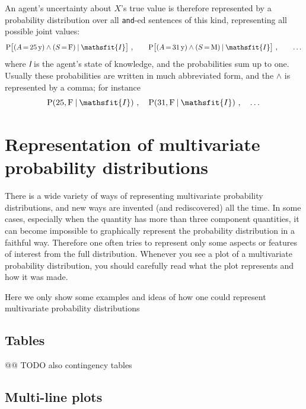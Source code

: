 \documentclass[
  a4paper,
  DIV=11,
  numbers=noendperiod,
  oneside]{scrreprt}
\begin{document}
An agent's uncertainty about \(X\)'s true value is therefore represented
by a probability distribution over all \texttt{and}-ed sentences of this
kind, representing all possible joint values: \[
\mathrm{P}\bigl[(A \mathord{\,=\,}25\,\mathrm{y}) \land (S\mathord{\,=\,}\mathrm{F}) \nonscript\:\vert\nonscript\:\mathopen{} \mathsfit{I}\bigr] \ , \qquad
\mathrm{P}\bigl[(A \mathord{\,=\,}31\,\mathrm{y}) \land (S\mathord{\,=\,}\mathrm{M}) \nonscript\:\vert\nonscript\:\mathopen{} \mathsfit{I}\bigr] \ , \qquad
\dotsc
\] where \(\mathsfit{I}\) is the agent's state of knowledge, and the
probabilities sum up to one. Usually these probabilities are written in
much abbreviated form, and the \(\land\) is represented by a comma; for
instance \[
\mathrm{P}(25, \mathrm{F} \nonscript\:\vert\nonscript\:\mathopen{} \mathsfit{I}) \ , \quad
\mathrm{P}(31, \mathrm{F} \nonscript\:\vert\nonscript\:\mathopen{} \mathsfit{I}) \ , \quad
\dotsc
\]

\hypertarget{representation-of-multivariate-probability-distributions}{%
\section{Representation of multivariate probability
distributions}\label{representation-of-multivariate-probability-distributions}}

There is a wide variety of ways of representing multivariate probability
distributions, and new ways are invented (and rediscovered) all the
time. In some cases, especially when the quantity has more than three
component quantities, it can become impossible to graphically represent
the probability distribution in a faithful way. Therefore one often
tries to represent only some aspects or features of interest from the
full distribution. Whenever you see a plot of a multivariate probability
distribution, you should carefully read what the plot represents and how
it was made.

Here we only show some examples and ideas of how one could represent
multivariate probability distributions

\hypertarget{tables}{%
\subsection{Tables}\label{tables}}

@@ TODO also contingency tables

\hypertarget{multi-line-plots}{%
\subsection{Multi-line plots}\label{multi-line-plots}}
\end{document}
